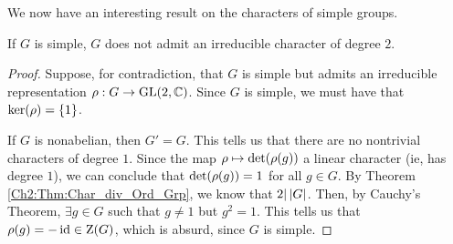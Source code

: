We now have an interesting result on the characters of simple groups.

\begin{lemma}
    If $G$ is simple, $G$ does not admit an irreducible character of degree $2$.
\end{lemma}
\begin{proof}
    Suppose, for contradiction, that $G$ is simple but admits an irreducible representation $\rho : G \to \operatorname{GL}\!\left( 2, \mathbb{C} \right)$. Since $G$ is simple, we must have that $\operatorname{ker}\!\left( \rho \right) = \left\{ 1 \right\}$.

    If $G$ is nonabelian, then $G' = G$. This tells us that there are no nontrivial characters of degree $1$. Since the map $\rho \mapsto \det\!\left( \rho(g) \right)$ a linear character (ie, has degree $1$), we can conclude that $\det\!\left( \rho(g) \right) = 1$ for all $g \in G$. By Theorem \ref{Ch2:Thm:Char_div_Ord_Grp}, we know that $2 \vert \left\lvert G \right\rvert$. Then, by Cauchy's Theorem, $\exists g \in G$ such that $g \neq 1$ but $g^2 = 1$. This tells us that $\rho(g) = -\operatorname{id} \in \operatorname{Z}\!\left( G \right)$, which is absurd, since $G$ is simple. 
\end{proof}
